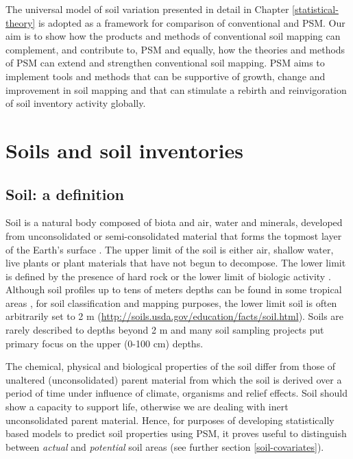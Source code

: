\documentclass[graybox,natbib,nospthms,UStrade]{svmono}
\begin{document}
The universal model of soil variation presented in detail in
Chapter \ref{statistical-theory} is adopted as a framework for comparison of
conventional and PSM. Our aim is to show how the products
and methods of conventional soil mapping can complement, and contribute to,
PSM and equally, how the theories and methods of
PSM can extend and strengthen conventional soil mapping.
PSM aims to implement tools and methods that can be supportive of
growth, change and improvement in soil mapping and that can stimulate a
rebirth and reinvigoration of soil inventory activity globally.

\hypertarget{soils-and-soil-inventories}{%
\section{Soils and soil inventories}\label{soils-and-soil-inventories}}

\hypertarget{soil-a-definition}{%
\subsection{Soil: a definition}\label{soil-a-definition}}

Soil is a natural body composed of biota and air, water and minerals,
developed from unconsolidated or semi-consolidated material that forms the
topmost layer of the Earth's surface \citep{chesworth2008encyclopedia}. The
upper limit of the soil is either air, shallow water, live plants or
plant materials that have not begun to decompose. The lower limit is
defined by the presence of hard rock or the lower limit of biologic
activity \citep{Richter1995, SSDS1993}. Although soil profiles up to tens
of meters depths can be found in some tropical areas \citep{Richter1995}, for
soil classification and mapping purposes, the lower limit soil is often
arbitrarily set to 2 m (\url{http://soils.usda.gov/education/facts/soil.html}). Soils are rarely described to depths beyond 2 m and
many soil sampling projects put primary focus on the upper
(0-100 cm) depths.

The chemical, physical and biological properties of the soil differ from
those of unaltered (unconsolidated) parent material from which the soil
is derived over a period of time under influence of climate, organisms
and relief effects. Soil should show a capacity to support life,
otherwise we are dealing with inert unconsolidated parent material. Hence, for
purposes of developing statistically based models to predict soil
properties using PSM, it proves useful to distinguish between \emph{actual}
and \emph{potential} soil areas (see further section \ref{soil-covariates}).
\end{document}
